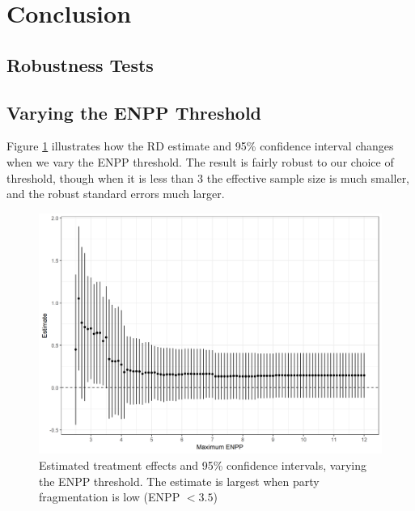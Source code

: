 \documentclass[12pt]{article}
\begin{document}


\section{Conclusion}





\begin{appendices}
	
	
	\section{Robustness Tests} \label{appendix:robustness}
	
	\subsection{Varying the ENPP Threshold}
	Figure \ref{fig:rdEstimateVaryingENPP} illustrates how the RD estimate and 95\% confidence interval changes when we vary the ENPP threshold. The result is fairly robust to our choice of threshold, though when it is less than 3 the effective sample size is much smaller, and the robust standard errors much larger. 
	
	\begin{figure}[h]
		\centering
		\includegraphics[width=\linewidth]{Figures/rdEstimateVaryingENPP}
		\caption{Estimated treatment effects and 95\% confidence intervals, varying the ENPP threshold. The estimate is largest when party fragmentation is low (ENPP $< 3.5$)}
		\label{fig:rdEstimateVaryingENPP}
	\end{figure}


\end{appendices}
\end{document}
